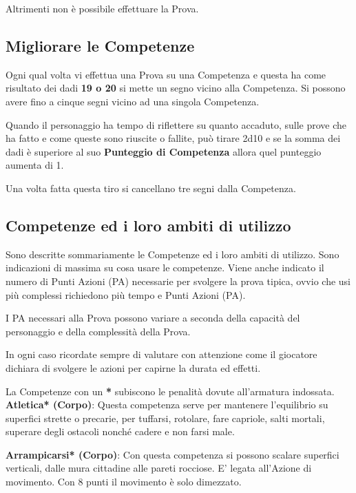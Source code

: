 \documentclass[12pt,a4paper,twoside,openany]{book}
\begin{document}
\begin{multicols}{2}
Altrimenti non è possibile effettuare la Prova.

\subsection{Migliorare le Competenze}\hypertarget{Migliorare le Competenze}{} \label{Migliorare le Competenze}

Ogni qual volta vi effettua una Prova su una Competenza e questa ha come risultato dei dadi \textbf{19 o 20} si mette un segno vicino alla Competenza. Si possono avere fino a cinque segni vicino ad una singola Competenza.

Quando il personaggio ha tempo di riflettere su quanto accaduto, sulle prove che ha fatto e come queste sono riuscite o fallite, può tirare 2d10 e se la somma dei dadi è superiore al suo \textbf{Punteggio di Competenza} allora quel punteggio aumenta di 1.

Una volta fatta questa tiro si cancellano tre segni dalla Competenza.	

\subsection{Competenze ed i loro ambiti di utilizzo}\label{competenzeambitidiutilizzo}

Sono descritte sommariamente le Competenze ed i loro ambiti di utilizzo. Sono indicazioni di massima su cosa usare le competenze. Viene anche indicato il numero di Punti Azioni (PA) necessarie per svolgere la prova tipica, ovvio che usi più complessi richiedono più tempo e Punti Azioni (PA).

I PA necessari alla Prova possono variare a seconda della capacità del personaggio e della complessità della Prova.

In ogni caso ricordate sempre di valutare con attenzione come il giocatore dichiara di svolgere le azioni per capirne la durata ed effetti. 

La Competenze con un \textbf{*} subiscono le penalità dovute all'armatura indossata.\\

\textbf{Atletica* (Corpo)}: Questa competenza serve per mantenere l'equilibrio su superfici strette o precarie, per tuffarsi, rotolare, fare capriole, salti mortali, superare degli ostacoli nonché cadere e non farsi male. 

\textbf{Arrampicarsi* (Corpo)}: Con questa competenza si possono scalare superfici verticali, dalle mura cittadine alle pareti rocciose. E' legata all'Azione di movimento. Con 8 punti il movimento è solo dimezzato.


\end{multicols}
\end{document}

